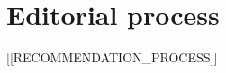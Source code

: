 \documentclass[a4paper]{article}
\newcommand{\recommender}{[[RECOMMENDER_NAMES]]}
\begin{document}
\beginingpreprint

\section*{\centering Editorial process}

[[RECOMMENDATION_PROCESS]]



\end{document}
